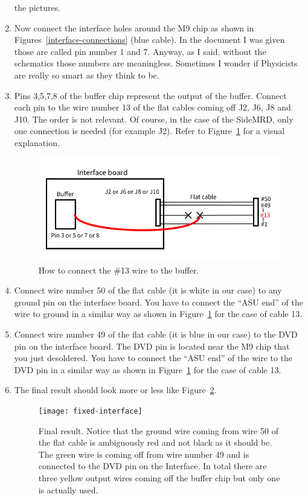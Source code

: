 \begin{enumerate}
  the pictures.
\item Now connect the interface holes around the M9 chip as shown in
  Figures~\ref{interface-connections} (blue cable). In the document I was given
  those are called pin number 1 and 7. Anyway, as I said, without the schematics
  those numbers are meaningless. Sometimes I wonder if Physicists are really so
  smart as they think to be.
\item Pins 3,5,7,8 of the buffer chip represent the output of the
  buffer. Connect each pin to the wire number 13 of the flat cables coming off
  J2, J6, J8 and J10. The order is not relevant. Of course, in the case of the
  SideMRD, only one connection is needed (for example J2). Refer to
  Figure~\ref{connection_flat_cable} for a visual explanation.
  \begin{figure}[H]
    \centering \includegraphics[width=0.6\linewidth]{connection_flat_cable}
    \caption{How to connect the \#13 wire to the buffer.}%
    \label{connection_flat_cable}
  \end{figure}
\item Connect wire number 50 of the flat cable (it is white in our case) to any
  ground pin on the interface board. You have to connect the ``ASU end'' of the
  wire to ground in a similar way as shown in Figure~\ref{connection_flat_cable}
  for the case of cable 13.
\item Connect wire number 49 of the flat cable (it is blue in our case) to the
  DVD pin on the interface board. The DVD pin is located near the M9 chip that
  you just desoldered. You have to connect the ``ASU end'' of the wire to the
  DVD pin in a similar way as shown in Figure~\ref{connection_flat_cable} for
  the case of cable 13.
\item The final result should look more or less like
  Figure~\ref{fixed-interface}.
  \begin{figure}[ht]
    \centering \texttt{[image: fixed-interface]}
    \caption{Final result. Notice that the ground wire coming from wire 50 of
      the flat cable is ambiguously red and not black as it should be. The green
      wire is coming off from wire number 49 and is connected to the DVD pin on
      the Interface. In total there are three yellow output wires coming off the
      buffer chip but only one is actually used.}\label{fixed-interface}
  \end{figure}
\end{enumerate}

